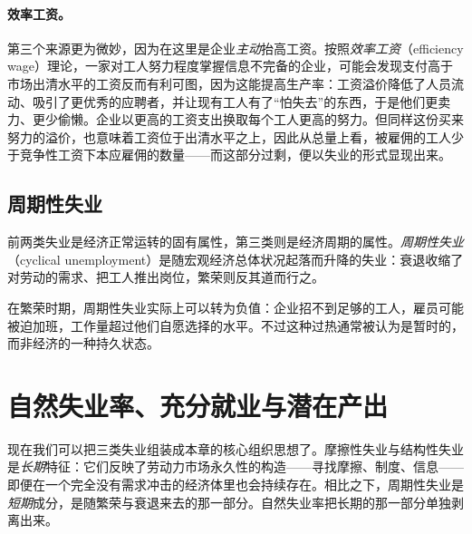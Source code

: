 \paragraph{效率工资。}
第三个来源更为微妙，因为在这里是企业\emph{主动}抬高工资。按照\emph{效率工资}（efficiency wage）理论，一家对工人努力程度掌握信息不完备的企业，可能会发现支付高于市场出清水平的工资反而有利可图，因为这能提高生产率：工资溢价降低了人员流动、吸引了更优秀的应聘者，并让现有工人有了“怕失去”的东西，于是他们更卖力、更少偷懒。企业以更高的工资支出换取每个工人更高的努力。但同样这份买来努力的溢价，也意味着工资位于出清水平之上，因此从总量上看，被雇佣的工人少于竞争性工资下本应雇佣的数量——而这部分过剩，便以失业的形式显现出来。


\subsection{周期性失业}

前两类失业是经济正常运转的固有属性，第三类则是经济周期的属性。\emph{周期性失业}（cyclical unemployment）是随宏观经济总体状况起落而升降的失业：衰退收缩了对劳动的需求、把工人推出岗位，繁荣则反其道而行之。


在繁荣时期，周期性失业实际上可以转为负值：企业招不到足够的工人，雇员可能被迫加班，工作量超过他们自愿选择的水平。不过这种过热通常被认为是暂时的，而非经济的一种持久状态。

\section{自然失业率、充分就业与潜在产出}

现在我们可以把三类失业组装成本章的核心组织思想了。摩擦性失业与结构性失业是\emph{长期}特征：它们反映了劳动力市场永久性的构造——寻找摩擦、制度、信息——即便在一个完全没有需求冲击的经济体里也会持续存在。相比之下，周期性失业是\emph{短期}成分，是随繁荣与衰退来去的那一部分。自然失业率把长期的那一部分单独剥离出来。


